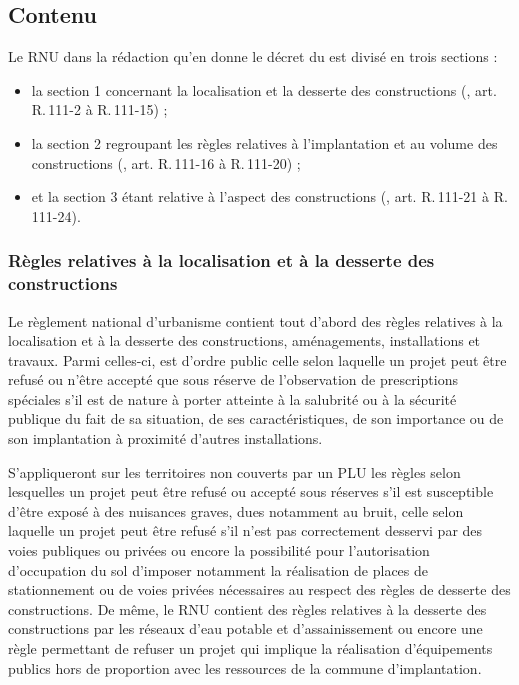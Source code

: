 	\subsection{Contenu}

	Le RNU dans la rédaction qu'en donne le décret du  est divisé en trois sections :
	\begin{itemize}
		\item la section 1 concernant la localisation et la desserte des constructions (\cu*, art. R.\,111-2 à R.\,111-15) ;
		\item la section 2 regroupant les règles relatives à l'implantation et au volume des constructions (\cu*, art. R.\,111-16 à R.\,111-20) ;
		\item et la section 3 étant relative à l'aspect des constructions (\cu*, art. R.\,111-21 à R.\,111-24).
	\end{itemize}

		\subsubsection{Règles relatives à la localisation et à la desserte des constructions}

			Le règlement national d'urbanisme contient tout d'abord des règles relatives à la localisation et à la desserte des constructions, aménagements, installations et travaux. Parmi celles-ci, est d'ordre public celle selon laquelle un projet peut être refusé ou n'être accepté que sous réserve de l'observation de prescriptions spéciales s'il est de nature à porter atteinte à la salubrité ou à la sécurité publique du fait de sa situation, de ses caractéristiques, de son importance ou de son implantation à proximité d'autres installations.

			S'appliqueront sur les territoires non couverts par un PLU les règles selon lesquelles un projet peut être refusé ou accepté sous réserves s'il est susceptible d'être exposé à des nuisances graves, dues notamment au bruit, celle selon laquelle un projet peut être refusé s'il n'est pas correctement desservi par des voies publiques ou privées ou encore la possibilité pour l'autorisation d'occupation du sol d'imposer notamment la réalisation de places de stationnement ou de voies privées nécessaires au respect des règles de desserte des constructions. De même, le RNU contient des règles relatives à la desserte des constructions par les réseaux d'eau potable et d'assainissement ou encore une règle permettant de refuser un projet qui implique la réalisation d'équipements publics hors de proportion avec les ressources de la commune d'implantation.

